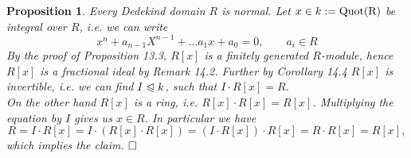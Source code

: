 \documentclass[11pt]{book}
\newtheorem{proposition}[theorem]{Proposition}
\theoremstyle{nonumberbreak}
\newenvironment{pr}[1][]{\ifthenelse{\equal{#1}{}}{\proof}{\proof[#1]}\rm}{\endproof}
\begin{document}
\begin{spacing}{1.3}
\begin{proposition} %
Every Dedekind domain $R$ is normal. 
\begin{pr}
Let $x \in k:= \rm{Quot}(R)$ be integral over $R$, i.e. we can write
$$x^n+a_{n-1}X^{n-1} + \ldots a_1x+a_0=0, \qquad a_i \in R$$
By the proof of Proposition 13.3, $R[x]$ is a finitely generated $R$-module, hence $R[x]$ is a fractional ideal by Remark 14.2. Further by Corollary 14.4 $R[x]$ is invertible, i.e. we can find $I \trianglelefteqslant k$, such that $I \cdot R[x]=R$.\\
On the other hand $R[x]$ is a ring, i.e. $R[x] \cdot R[x] = R[x]$. Multiplying the equation by $I$ gives us $x \in R$. In particular we have
$$R=I \cdot R[x]=I \cdot (R[x] \cdot R[x])=(I \cdot R[x])\cdot R[x]=R \cdot R[x]=R[x],$$
which implies the claim. $\hfill \Box$

\end{pr}
\end{proposition}


\end{spacing}
\end{document}
